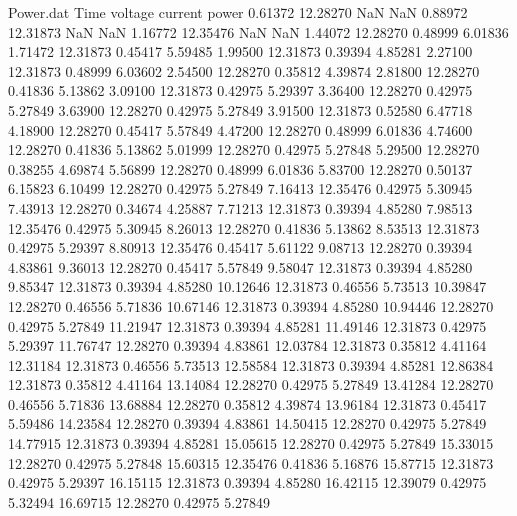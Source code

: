 \begin{filecontents}{Power.dat}
Time voltage current power
   0.61372   12.28270        NaN        NaN
   0.88972   12.31873        NaN        NaN
   1.16772   12.35476        NaN        NaN
   1.44072   12.28270    0.48999    6.01836
   1.71472   12.31873    0.45417    5.59485
   1.99500   12.31873    0.39394    4.85281
   2.27100   12.31873    0.48999    6.03602
   2.54500   12.28270    0.35812    4.39874
   2.81800   12.28270    0.41836    5.13862
   3.09100   12.31873    0.42975    5.29397
   3.36400   12.28270    0.42975    5.27849
   3.63900   12.28270    0.42975    5.27849
   3.91500   12.31873    0.52580    6.47718
   4.18900   12.28270    0.45417    5.57849
   4.47200   12.28270    0.48999    6.01836
   4.74600   12.28270    0.41836    5.13862
   5.01999   12.28270    0.42975    5.27848
   5.29500   12.28270    0.38255    4.69874
   5.56899   12.28270    0.48999    6.01836
   5.83700   12.28270    0.50137    6.15823
   6.10499   12.28270    0.42975    5.27849
   7.16413   12.35476    0.42975    5.30945
   7.43913   12.28270    0.34674    4.25887
   7.71213   12.31873    0.39394    4.85280
   7.98513   12.35476    0.42975    5.30945
   8.26013   12.28270    0.41836    5.13862
   8.53513   12.31873    0.42975    5.29397
   8.80913   12.35476    0.45417    5.61122
   9.08713   12.28270    0.39394    4.83861
   9.36013   12.28270    0.45417    5.57849
   9.58047   12.31873    0.39394    4.85280
   9.85347   12.31873    0.39394    4.85280
  10.12646   12.31873    0.46556    5.73513
  10.39847   12.28270    0.46556    5.71836
  10.67146   12.31873    0.39394    4.85280
  10.94446   12.28270    0.42975    5.27849
  11.21947   12.31873    0.39394    4.85281
  11.49146   12.31873    0.42975    5.29397
  11.76747   12.28270    0.39394    4.83861
  12.03784   12.31873    0.35812    4.41164
  12.31184   12.31873    0.46556    5.73513
  12.58584   12.31873    0.39394    4.85281
  12.86384   12.31873    0.35812    4.41164
  13.14084   12.28270    0.42975    5.27849
  13.41284   12.28270    0.46556    5.71836
  13.68884   12.28270    0.35812    4.39874
  13.96184   12.31873    0.45417    5.59486
  14.23584   12.28270    0.39394    4.83861
  14.50415   12.28270    0.42975    5.27849
  14.77915   12.31873    0.39394    4.85281
  15.05615   12.28270    0.42975    5.27849
  15.33015   12.28270    0.42975    5.27848
  15.60315   12.35476    0.41836    5.16876
  15.87715   12.31873    0.42975    5.29397
  16.15115   12.31873    0.39394    4.85280
  16.42115   12.39079    0.42975    5.32494
  16.69715   12.28270    0.42975    5.27849

\end{filecontents}
